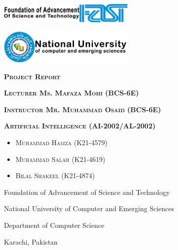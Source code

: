 \documentclass[10pt]{article}
\begin{document}
\begin{titlepage}
    \centering
    \vspace{3.5cm}
    \includegraphics[width=0.5\textwidth]{FAST.png}\par\vspace{1cm}
    \includegraphics[width=0.5\textwidth]{NU-logo.jpg}\par\vspace{1cm}
    \vspace{1.5cm}
    {\scshape\Huge\textbf {Project Report} \par}
    \vspace{1.5cm}
    \vspace{1cm}
    {\scshape\LARGE\textbf {Lecturer Ms. Mafaza Mohi (BCS-6E)}\\ \par}
    \vspace{1cm}
    {\scshape\LARGE\textbf {Instructor Mr. Muhammad Osaid (BCS-6E)}\\ \par}
    \vspace{1cm}
    {\scshape\LARGE\textbf {Artificial Intelligence (AI-2002/AL-2002)} \par}
    \vspace{1.25cm}
    \vspace{1.25cm}
    \begin{itemize}
    \item {\scshape\LARGE Muhammad Hamza (K21-4579) \par}
    \vspace{0.12cm}
    \item {\scshape\LARGE Muhammad Salar (K21-4619) \par}
    \vspace{0.12cm}
    \item {\scshape\LARGE Bilal Shakeel (K21-4874) \par}
    \end{itemize}
    \vfill   
    {Foundation of Advancement of Science and Technology \par}
    {National University of Computer and Emerging Sciences \par}
    {Department of Computer Science \par}
    {Karachi, Pakistan \par}
\end{titlepage}
\end{document}
